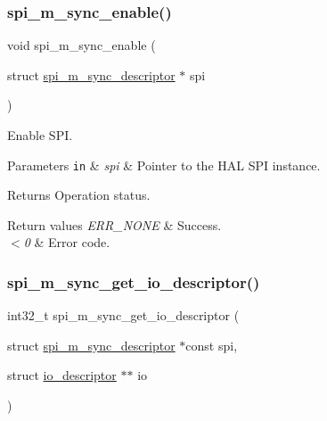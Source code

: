 \subsubsection{\texorpdfstring{spi\+\_\+m\+\_\+sync\+\_\+enable()}{spi\_m\_sync\_enable()}}
{\footnotesize\ttfamily void spi\+\_\+m\+\_\+sync\+\_\+enable (\begin{DoxyParamCaption}\item[{struct \hyperlink{structspi__m__sync__descriptor}{spi\+\_\+m\+\_\+sync\+\_\+descriptor} $\ast$}]{spi }\end{DoxyParamCaption})}



Enable S\+PI. 


\begin{DoxyParams}[1]{Parameters}
\mbox{\tt in}  & {\em spi} & Pointer to the H\+AL S\+PI instance.\\
\hline
\end{DoxyParams}
\begin{DoxyReturn}{Returns}
Operation status. 
\end{DoxyReturn}

\begin{DoxyRetVals}{Return values}
{\em E\+R\+R\+\_\+\+N\+O\+NE} & Success. \\
\hline
{\em $<$0} & Error code. \\
\hline
\end{DoxyRetVals}
\mbox{\label{group__doc__driver__hal__spi__master__sync_ga658f37bdda03b932a3400c5bb2abccff}} 
\subsubsection{\texorpdfstring{spi\+\_\+m\+\_\+sync\+\_\+get\+\_\+io\+\_\+descriptor()}{spi\_m\_sync\_get\_io\_descriptor()}}
{\footnotesize\ttfamily int32\+\_\+t spi\+\_\+m\+\_\+sync\+\_\+get\+\_\+io\+\_\+descriptor (\begin{DoxyParamCaption}\item[{struct \hyperlink{structspi__m__sync__descriptor}{spi\+\_\+m\+\_\+sync\+\_\+descriptor} $\ast$const}]{spi,  }\item[{struct \hyperlink{structio__descriptor}{io\+\_\+descriptor} $\ast$$\ast$}]{io }\end{DoxyParamCaption})}



